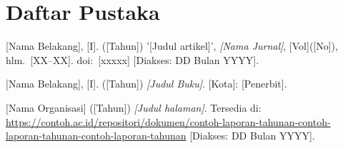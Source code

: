 
\chapter*{Daftar Pustaka}

%
%
%
%
%
%
%

\begin{thesisbibliography}

[Nama Belakang], [I]. ([Tahun]) '[Judul artikel]',
\textit{[Nama Jurnal]}, [Vol]([No]), hlm.~[XX--XX].
doi:~[xxxxx] [Diakses: DD Bulan YYYY].

[Nama Belakang], [I]. ([Tahun]) \textit{[Judul Buku]}.
[Kota]: [Penerbit].

[Nama Organisasi] ([Tahun]) \textit{[Judul halaman]}.
Tersedia di: \url{https://contoh.ac.id/repositori/dokumen/contoh-laporan-tahunan-contoh-laporan-tahunan-contoh-laporan-tahunan} [Diakses: DD Bulan YYYY].


\end{thesisbibliography}
